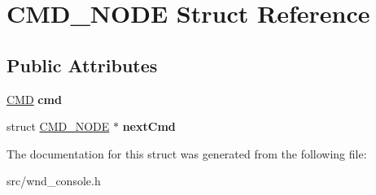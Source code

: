 \hypertarget{struct_c_m_d___n_o_d_e}{}\section{C\+M\+D\+\_\+\+N\+O\+D\+E Struct Reference}
\label{struct_c_m_d___n_o_d_e}
\subsection*{Public Attributes}
\begin{DoxyCompactItemize}
\item 
\hypertarget{struct_c_m_d___n_o_d_e_a5914be2d642492a855475d01af0ca6cf}{}\hyperlink{struct_c_m_d}{C\+M\+D} {\bfseries cmd}\label{struct_c_m_d___n_o_d_e_a5914be2d642492a855475d01af0ca6cf}

\item 
\hypertarget{struct_c_m_d___n_o_d_e_a7ef7d31cc01fe847671a16af7dbfae45}{}struct \hyperlink{struct_c_m_d___n_o_d_e}{C\+M\+D\+\_\+\+N\+O\+D\+E} $\ast$ {\bfseries next\+Cmd}\label{struct_c_m_d___n_o_d_e_a7ef7d31cc01fe847671a16af7dbfae45}

\end{DoxyCompactItemize}


The documentation for this struct was generated from the following file\+:\begin{DoxyCompactItemize}
\item 
src/wnd\+\_\+console.\+h\end{DoxyCompactItemize}
